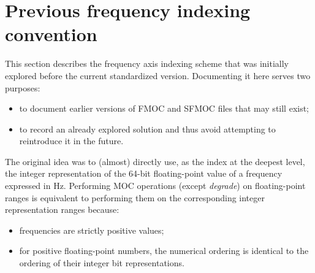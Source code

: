 \section{Previous frequency indexing convention\label{sec:apx:fmoc1}}

This section describes the frequency axis indexing scheme that was initially explored before
the current standardized version. Documenting it here serves two purposes:
\begin{itemize}
    \item to document earlier versions of FMOC and SFMOC files that may still exist;
    \item to record an already explored solution and thus avoid attempting to reintroduce it in the future.
\end{itemize}

The original idea was to (almost) directly use, as the index at the deepest level,
the integer representation of the 64-bit floating-point value of a frequency expressed in Hz.
Performing MOC operations (except \textit{degrade}) on floating-point ranges is equivalent to
performing them on the corresponding integer representation ranges because:
\begin{itemize}
  \item frequencies are strictly positive values;
  \item for positive floating-point numbers, the numerical ordering is identical to the ordering of their
        integer bit representations.
\end{itemize}

